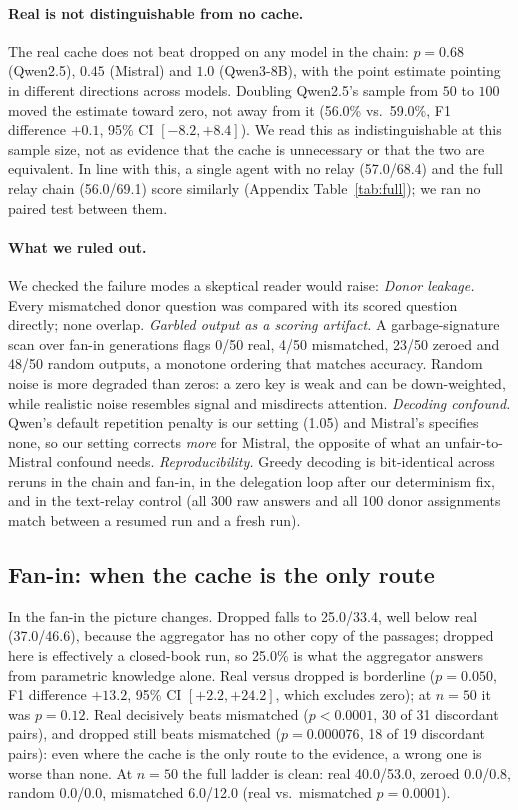 \documentclass[11pt]{article}
\begin{document}
\paragraph{Real is not distinguishable from no cache.} The real cache does
not beat dropped on any model in the chain: $p=0.68$ (Qwen2.5), $0.45$ (Mistral) and
$1.0$ (Qwen3-8B), with the point estimate pointing in different
directions across models. Doubling Qwen2.5's sample from $50$ to $100$
moved the estimate toward zero, not away from it (56.0\% vs.\ 59.0\%, F1
difference $+0.1$, 95\% CI $[-8.2,+8.4]$). We read this as
indistinguishable at this sample size, not as evidence that the cache is
unnecessary or that the two are equivalent. In line with this, a single
agent with no relay (57.0/68.4) and the full relay chain (56.0/69.1) score
similarly (Appendix Table~\ref{tab:full}); we ran no paired test between
them.

\paragraph{What we ruled out.} We checked the failure modes a skeptical
reader would raise:
\emph{Donor leakage.} Every mismatched donor question was compared with
its scored question directly; none overlap.
\emph{Garbled output as a scoring artifact.} A garbage-signature scan
over fan-in generations flags 0/50 real, 4/50 mismatched, 23/50 zeroed and
48/50 random outputs, a monotone ordering that matches accuracy. Random noise
is more degraded than zeros: a zero key is weak and can be down-weighted,
while realistic noise resembles signal and misdirects attention.
\emph{Decoding confound.} Qwen's default repetition penalty is our
setting (1.05) and Mistral's specifies none, so our setting corrects
\emph{more} for Mistral, the opposite of what an unfair-to-Mistral confound
needs.
\emph{Reproducibility.} Greedy decoding is bit-identical across reruns
in the chain and fan-in, in the delegation loop after our determinism fix, and in
the text-relay control (all 300 raw answers and all 100 donor assignments match
between a resumed run and a fresh run).


\subsection{Fan-in: when the cache is the only route}

In the fan-in the picture changes. Dropped falls to 25.0/33.4, well below
real (37.0/46.6), because the aggregator has no other copy of the passages;
dropped here is effectively a closed-book run, so 25.0\% is what the aggregator
answers from parametric knowledge alone. Real versus dropped is borderline ($p=0.050$, F1 difference
$+13.2$, 95\% CI $[+2.2,+24.2]$, which excludes zero); at $n{=}50$ it was
$p=0.12$. Real decisively beats mismatched ($p<0.0001$, 30 of 31
discordant pairs), and dropped still beats mismatched ($p=0.000076$, 18
of 19 discordant pairs): even where the cache is the only route to the
evidence, a wrong one is worse than none. At $n{=}50$ the full ladder is
clean: real 40.0/53.0, zeroed 0.0/0.8, random 0.0/0.0, mismatched
6.0/12.0 (real vs.\ mismatched $p=0.0001$).
\end{document}
